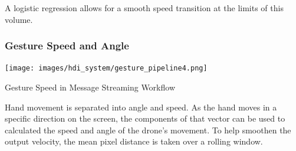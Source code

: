 A logistic regression allows  for a smooth speed transition at the limits of this volume. 





\subsubsection{Gesture Speed and Angle}

\begin{marginfigure}%
  \vspace{2cm}
  \texttt{[image: images/hdi\_system/gesture\_pipeline4.png]}
  \caption{Gesture Speed in Message Streaming Workflow}
\end{marginfigure}

Hand movement is separated into angle and speed. As the hand moves in a specific direction on the screen, the components of that vector can be used to calculated the speed and angle of the drone’s movement. To help smoothen the output velocity, the mean pixel distance is taken over a rolling window.%

